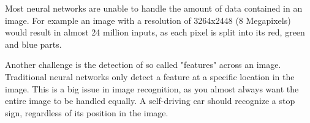 Most neural networks are unable to handle the amount of data contained in an image.
For example an image with a resolution of 3264x2448 (8 Megapixels) would result in almost 24 million inputs, as each pixel is split into its red, green and blue parts.

Another challenge is the detection of so called "features" across an image. Traditional neural networks only detect a feature at a specific location in the image.
This is a big issue in image recognition, as you almost always want the entire image to be handled equally.
A self-driving car should recognize a stop sign, regardless of its position in the image.
